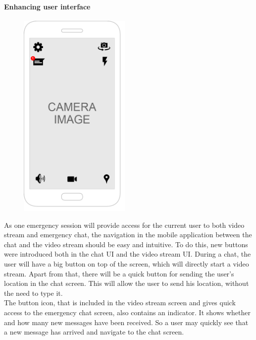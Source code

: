 \documentclass{article}
\begin{document}
\paragraph{Enhancing user interface}

\begin{figure}
\vspace{-20pt}
  \begin{center}
    \includegraphics[width=0.48\textwidth]{"ChatIteration2/videocalluielements (1)"}
  \end{center}
\end{figure}
As one emergency session will provide access for the current user to both video stream and emergency chat, the navigation in the mobile application between the chat and the video stream should be easy and intuitive. To do this, new buttons were introduced both in the chat UI and the video stream UI. During a chat, the user will have a big button on top of the screen, which will directly start a video stream. Apart from that, there will be a quick button for sending the user’s location in the chat screen. This will allow the user to send his location, without the need to type it.\\

The button icon, that is included in the video stream screen and gives quick access to the emergency chat screen, also contains an indicator. It shows whether and how many new messages have been received. So a user may quickly see that a new message has arrived and navigate to the chat screen.\\
\end{document}
